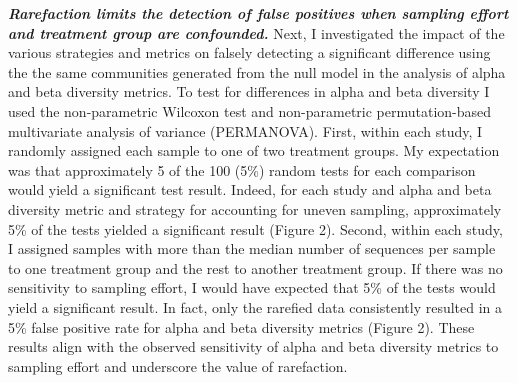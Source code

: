 \documentclass[
]{article}
\begin{document}
\textbf{\emph{Rarefaction limits the detection of false positives when
sampling effort and treatment group are confounded.}} Next, I
investigated the impact of the various strategies and metrics on falsely
detecting a significant difference using the the same communities
generated from the null model in the analysis of alpha and beta
diversity metrics. To test for differences in alpha and beta diversity I
used the non-parametric Wilcoxon test and non-parametric
permutation-based multivariate analysis of variance (PERMANOVA). First,
within each study, I randomly assigned each sample to one of two
treatment groups. My expectation was that approximately 5 of the 100
(5\%) random tests for each comparison would yield a significant test
result. Indeed, for each study and alpha and beta diversity metric and
strategy for accounting for uneven sampling, approximately 5\% of the
tests yielded a significant result (Figure 2). Second, within each
study, I assigned samples with more than the median number of sequences
per sample to one treatment group and the rest to another treatment
group. If there was no sensitivity to sampling effort, I would have
expected that 5\% of the tests would yield a significant result. In
fact, only the rarefied data consistently resulted in a 5\% false
positive rate for alpha and beta diversity metrics (Figure 2). These
results align with the observed sensitivity of alpha and beta diversity
metrics to sampling effort and underscore the value of rarefaction.
\end{document}
